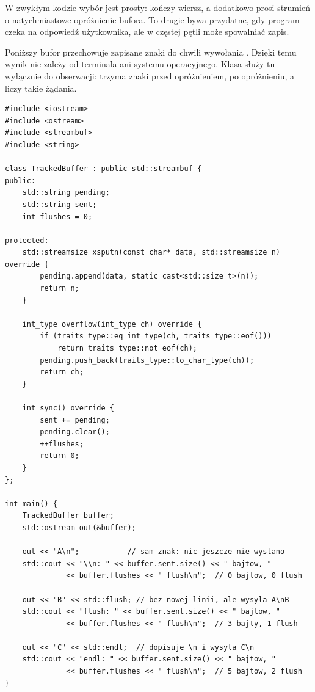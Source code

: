 W zwykłym kodzie wybór jest prosty:  kończy wiersz,
a  dodatkowo prosi strumień o natychmiastowe
opróżnienie bufora. To drugie bywa przydatne, gdy program czeka
na odpowiedź użytkownika, ale w częstej pętli może spowalniać zapis.

Poniższy bufor przechowuje zapisane znaki do chwili wywołania
. Dzięki temu wynik nie zależy od terminala ani systemu
operacyjnego. Klasa  służy tu wyłącznie do
obserwacji:  trzyma znaki przed opróżnieniem,
 po opróżnieniu, a  liczy takie żądania.

\begin{lstlisting}[caption={Roznica miedzy nowa linia, flush i endl (kompletny program, C++20).}]
#include <iostream>
#include <ostream>
#include <streambuf>
#include <string>

class TrackedBuffer : public std::streambuf {
public:
    std::string pending;
    std::string sent;
    int flushes = 0;

protected:
    std::streamsize xsputn(const char* data, std::streamsize n) override {
        pending.append(data, static_cast<std::size_t>(n));
        return n;
    }

    int_type overflow(int_type ch) override {
        if (traits_type::eq_int_type(ch, traits_type::eof()))
            return traits_type::not_eof(ch);
        pending.push_back(traits_type::to_char_type(ch));
        return ch;
    }

    int sync() override {
        sent += pending;
        pending.clear();
        ++flushes;
        return 0;
    }
};

int main() {
    TrackedBuffer buffer;
    std::ostream out(&buffer);

    out << "A\n";           // sam znak: nic jeszcze nie wyslano
    std::cout << "\\n: " << buffer.sent.size() << " bajtow, "
              << buffer.flushes << " flush\n";  // 0 bajtow, 0 flush

    out << "B" << std::flush; // bez nowej linii, ale wysyla A\nB
    std::cout << "flush: " << buffer.sent.size() << " bajtow, "
              << buffer.flushes << " flush\n";  // 3 bajty, 1 flush

    out << "C" << std::endl;  // dopisuje \n i wysyla C\n
    std::cout << "endl: " << buffer.sent.size() << " bajtow, "
              << buffer.flushes << " flush\n";  // 5 bajtow, 2 flush
}
\end{lstlisting}

